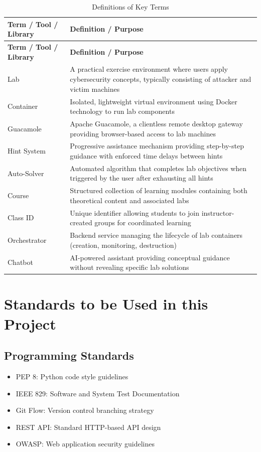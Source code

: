 \documentclass[12pt,a4paper]{report}
\newcommand{\hrow}{}
\newcommand{\hcell}[1]{\textbf{#1}}
\newcommand{\altrow}{}
\begin{document}
\begin{longtable}{|L{3.8cm}|L{10.2cm}|}
\caption{Definitions of Key Terms}\label{tab:definitions}\\
\hline
\hrow \hcell{Term / Tool / Library} & \hcell{Definition / Purpose} \\
\hline
\endfirsthead
\hline
\hrow \hcell{Term / Tool / Library} & \hcell{Definition / Purpose} \\
\hline
\endhead
Lab & A practical exercise environment where users apply cybersecurity concepts, typically consisting of attacker and victim machines \\\hline
\altrow Container & Isolated, lightweight virtual environment using Docker technology to run lab components \\\hline
Guacamole & Apache Guacamole, a clientless remote desktop gateway providing browser-based access to lab machines \\\hline
\altrow Hint System & Progressive assistance mechanism providing step-by-step guidance with enforced time delays between hints \\\hline
Auto-Solver & Automated algorithm that completes lab objectives when triggered by the user after exhausting all hints \\\hline
\altrow Course & Structured collection of learning modules containing both theoretical content and associated labs \\\hline
Class ID & Unique identifier allowing students to join instructor-created groups for coordinated learning \\\hline
\altrow Orchestrator & Backend service managing the lifecycle of lab containers (creation, monitoring, destruction) \\\hline
Chatbot & AI-powered assistant providing conceptual guidance without revealing specific lab solutions \\\hline
\end{longtable}

\section{Standards to be Used in this Project}

\subsection{Programming Standards}
\begin{itemize}
  \item PEP 8: Python code style guidelines
  \item IEEE 829: Software and System Test Documentation
  \item Git Flow: Version control branching strategy
  \item REST API: Standard HTTP-based API design
  \item OWASP: Web application security guidelines
\end{itemize}
\end{document}
